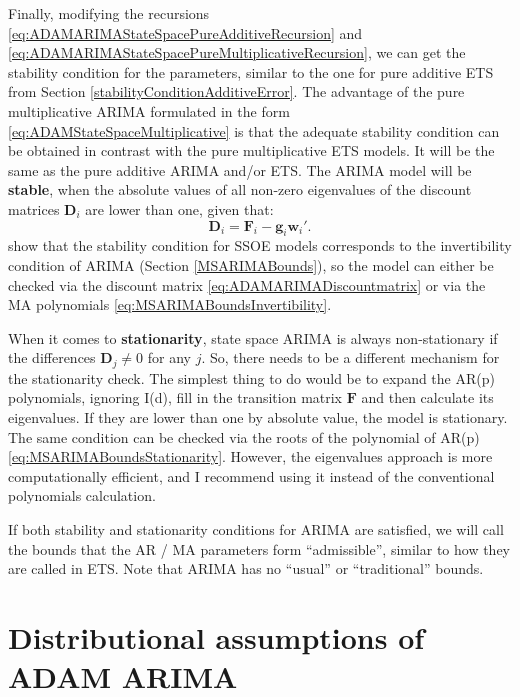 \documentclass[]{book}
\theoremstyle{definition}
\theoremstyle{definition}
\theoremstyle{definition}
\theoremstyle{definition}
\theoremstyle{remark}
\begin{document}
Finally, modifying the recursions \eqref{eq:ADAMARIMAStateSpacePureAdditiveRecursion} and \eqref{eq:ADAMARIMAStateSpacePureMultiplicativeRecursion}, we can get the stability condition for the parameters, similar to the one for pure additive ETS from Section \ref{stabilityConditionAdditiveError}. The advantage of the pure multiplicative ARIMA formulated in the form \eqref{eq:ADAMStateSpaceMultiplicative} is that the adequate stability condition can be obtained in contrast with the pure multiplicative ETS models. It will be the same as the pure additive ARIMA and/or ETS. The ARIMA model will be \textbf{stable}, when the absolute values of all non-zero eigenvalues of the discount matrices \(\mathbf{D}_{i}\) are lower than one, given that:
\begin{equation}
  \mathbf{D}_{i} = \mathbf{F}_{i} -\mathbf{g}_{i} \mathbf{w}_{i}' .
  \label{eq:ADAMARIMADiscountmatrix}
\end{equation}
\citet{Hyndman2008b} show that the stability condition for SSOE models corresponds to the invertibility condition of ARIMA (Section \ref{MSARIMABounds}), so the model can either be checked via the discount matrix \eqref{eq:ADAMARIMADiscountmatrix} or via the MA polynomials \eqref{eq:MSARIMABoundsInvertibility}.

When it comes to \textbf{stationarity}, state space ARIMA is always non-stationary if the differences \(\mathbf{D}_j \neq 0\) for any \(j\). So, there needs to be a different mechanism for the stationarity check. The simplest thing to do would be to expand the AR(p) polynomials, ignoring I(d), fill in the transition matrix \(\mathbf{F}\) and then calculate its eigenvalues. If they are lower than one by absolute value, the model is stationary. The same condition can be checked via the roots of the polynomial of AR(p) \eqref{eq:MSARIMABoundsStationarity}. However, the eigenvalues approach is more computationally efficient, and I recommend using it instead of the conventional polynomials calculation.

If both stability and stationarity conditions for ARIMA are satisfied, we will call the bounds that the AR / MA parameters form ``admissible'', similar to how they are called in ETS. Note that ARIMA has no ``usual'' or ``traditional'' bounds.

\hypertarget{ADAMARIMADistributions}{%
\section{Distributional assumptions of ADAM ARIMA}\label{ADAMARIMADistributions}}
\end{document}
